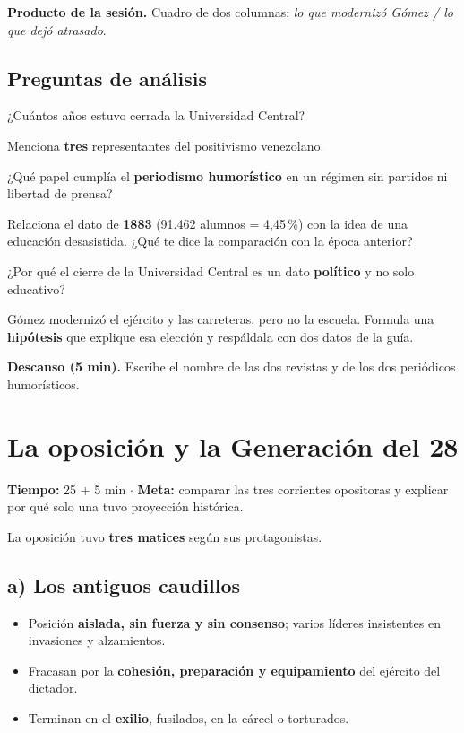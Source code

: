 \documentclass[12pt, letterpaper]{article}
\makeatletter
\let\mw@oldsection\section
\newcommand{\mw@prepage}{%
  \par
  \ifdim\pagegoal=\maxdimen\else
    \ifdim\dimexpr\pagegoal-\pagetotal\relax<7cm\relax
      \newpage
    \fi
  \fi}
\renewcommand{\section}{\mw@prepage\mw@oldsection}
\newcommand{\metasesion}[2]{%
  \begin{cabecerasesion}
    \small
    \textbf{\color{mwprimario}Tiempo:} #1 \quad$\cdot$\quad
    \textbf{\color{mwprimario}Meta:} #2
  \end{cabecerasesion}%
}
\newcommand{\pausa}[1]{%
  \begin{descanso}
    \small\textbf{\color{mwnaranja}Descanso (5 min).} #1
  \end{descanso}%
}
\makeatother
\begin{document}
\begin{cuadropasos}
  \small
  \textbf{Producto de la sesión.} Cuadro de dos columnas:
  \textit{lo que modernizó Gómez / lo que dejó atrasado}.
\end{cuadropasos}

\subsection*{Preguntas de análisis}
\begin{preguntas}
  \item \facil{} ¿Cuántos años estuvo cerrada la Universidad Central?
  \item \facil{} Menciona \textbf{tres} representantes del positivismo
        venezolano.
  \item \medio{} ¿Qué papel cumplía el \textbf{periodismo humorístico} en un
        régimen sin partidos ni libertad de prensa?
  \item \dificil{} Relaciona el dato de \textbf{1883} (91.462 alumnos =
        4,45\,\%) con la idea de una educación \guillemotleft
        desasistida\guillemotright. ¿Qué te dice la comparación con la época
        anterior?
  \item \dificil{} ¿Por qué el cierre de la Universidad Central es un dato
        \textbf{político} y no solo educativo?
  \item \muyDificil{} Gómez modernizó el ejército y las carreteras, pero no la
        escuela. Formula una \textbf{hipótesis} que explique esa elección y
        respáldala con dos datos de la guía.
\end{preguntas}

\pausa{Escribe el nombre de las dos revistas y de los dos periódicos
humorísticos.}

\section{La oposición y la Generación del 28}

\metasesion{25 + 5 min}{comparar las tres corrientes opositoras y explicar por
qué solo una tuvo proyección histórica.}

La oposición tuvo \textbf{tres matices} según sus protagonistas.

\subsection*{a) Los antiguos caudillos}
\begin{itemize}[leftmargin=*, itemsep=3pt]
  \item Posición \textbf{aislada, sin fuerza y sin consenso}; varios líderes
        insistentes en invasiones y alzamientos.
  \item Fracasan por la \textbf{cohesión, preparación y equipamiento} del
        ejército del dictador.
  \item Terminan en el \textbf{exilio}, fusilados, en la cárcel o torturados.
\end{itemize}
\end{document}
